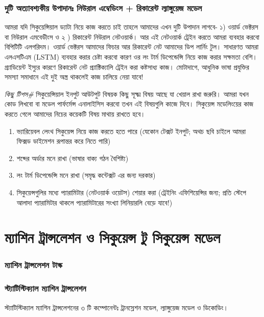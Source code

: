 \documentclass{book}
\begin{document}
\subsection{দুটি অত্যাবশ্যকীয় উপাদানঃ নিউরাল এম্বেডিংস + রিকারেন্ট ল্যাঙ্গুয়েজ মডেল}
আমরা যদি সিকুয়েন্সিয়াল ড্যাটা নিয়ে কাজ করতে চাই তাহলে আমাদের এখন দুটি উপাদান লাগবে- ১) ওয়ার্ড ভেক্টরস বা নিউরাল এমবেডীংস ও ২ ) রিকারেন্ট নিউরাল নেটওয়ার্ক। 
আর এই নেটওয়ার্ক ট্রেইন করতে আমরা ব্যবহার করবো বিপিটিটি এলগরিদম। ওয়ার্ড ভেক্টরস আমাদের ফিচার আর রিকারেন্ট নেট আমাদের ডিপ লার্নিং টুল। 
সাধারণত আমরা এলএসটিএম (LSTM) ব্যবহার করার চেষ্টা করবো কারণ ওর লং টার্ম ডিপেন্ডেন্সি নিয়ে কাজ করার সক্ষমতা বেশি। গ্র্যাডিয়েন্ট ইস্যুর কারণে রিকারেন্ট নেট প্র্যাক্টিক্যালি ট্রেইন করা 
কষ্টসাধ্য কাজ। মোটাদাগে, আধুনিক ভাষা প্রযুক্তির সমস্যা সমাধানে এই দুই অস্ত্র থাকলেই কাজ চালিয়ে নেয়া যাবে! 

\textit{কিছু টিপস\#}  সিকুয়েন্সিয়াল ইনপুট আউটপুট বিষয়ক কিছু সূক্ষ্ম বিষয় আছে যা খেয়াল রাখা জরুরি। আমরা যখন কোড লিখবো বা মডেল পার্ফর্মেন্স এনালাইসিস করবো তখন এই বিষয়গুলি কাজে দিবে।
সিকুয়েন্স মডেলিংয়ের কাজ করতে গেলে আমাদের নিচের কয়েকটি বিষয় মাথায় রাখতে হবে। 

\begin{enumerate}[label=(\roman*)]
\item ভ্যারিয়েবল লেংথ সিকুয়েন্স নিয়ে কাজ করতে হতে পারে (যেকোন টেক্সট ইনপুট;  অথচ ছবি চাইলে আমরা ফিক্সড ডাইমেশন রূপান্তর করে নিতে পারি) 
\item শব্দের অর্ডার মনে রাখা (ভাষার বাক্য গঠন বৈশিষ্ট্য) 
\item লং টার্ম ডিপেন্ডেন্সি মনে রাখা (সমৃদ্ধ কন্টেক্সট এর জন্য দরকার) 
\item সিকুয়েন্সগুলির মধ্যে প্যারামিটার (নেটওয়ার্ক ওয়েটস) শেয়ার করা (ট্রেইনিং এফিশিয়েন্সির জন্য; প্রতি স্টেপে আলাদা প্যারামিটার থাকলে প্যারামিটারের সংখ্যা লিনিয়ারলি বেড়ে যাবে!) 

\end{enumerate}

\chapter{ম্যাশিন ট্রান্সলেশন ও  সিকুয়েন্স টু সিকুয়েন্স মডেল}
\subsection{ম্যাশিন ট্রান্সলেশন টাস্ক}
\subsection{স্ট্যাটিস্টিক্যাল ম্যাশিন ট্রান্সলেশন} 
স্ট্যাটিস্টিক্যাল ম্যাশিন ট্রান্সলেশনের ৩ টি কম্পোনেন্টঃ ট্রানস্লেশন মডেল, ল্যাঙ্গুয়েজ মডেল ও  ডিকোডিং। 
\end{document}
